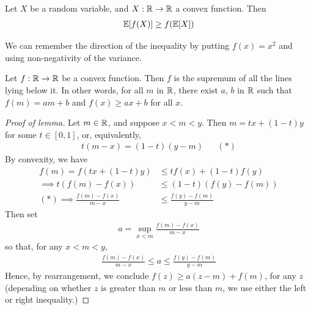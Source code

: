 \documentclass{../template/note}
\begin{document}
    \begin{proposition}
        Let \(X\) be a random variable, and \(X: \mathbb R \to \mathbb R\) a convex function. Then
        \begin{align*}
            \mathbb E[f(X)] \geq f(\mathbb E[X])
        \end{align*}
    \end{proposition}
    
    \begin{remark*}
        We can remember the direction of the inequality by putting \(f(x) = x^2\) and using non-negativity of the variance.
    \end{remark*}
    
    \begin{lemma}
        Let \(f: \mathbb R \to \mathbb R\) be a convex function. Then \(f\) is the supremum of all the lines lying below it. In other words, for all \(m\) in \(\mathbb R\), there exist \(a\), \(b\) in \(\mathbb R\) such that \(f(m) = am + b\) and \(f(x) \geq ax + b\) for all \(x\).
    \end{lemma}
    
    \begin{proof}[Proof of lemma]
        Let \(m \in \mathbb R\), and suppose \(x < m < y\). Then \(m = tx + (1-t)y\) for some \(t \in [0, 1]\), or, equivalently,
        \begin{align*}
            t(m-x) = (1-t)(y-m) && (*)
        \end{align*}
        By convexity, we have
        \begin{align*}
            f(m) = f(tx + (1-t)y) &\leq tf(x) + (1-t)f(y) \\
            \implies t(f(m) - f(x)) &\leq (1-t)(f(y)-f(m)) \\
            (*) \implies \frac{f(m)-f(x)}{m-x} &\leq \frac{f(y)-f(m)}{y-m}
        \end{align*}
        Then set
        \begin{align*}
            a = \sup_{x < m} \frac{f(m)-f(x)}{m-x}
        \end{align*}
        so that, for any \(x < m < y\),
        \begin{align*}
            \frac{f(m)-f(x)}{m-x} \leq a \leq \frac{f(y)-f(m)}{y-m}
        \end{align*}
        Hence, by rearrangement, we conclude \(f(z) \geq a(z-m) + f(m)\), for any \(z\) (depending on whether \(z\) is greater than \(m\) or less than \(m\), we use either the left or right inequality.)        
    \end{proof}
    
\end{document}
